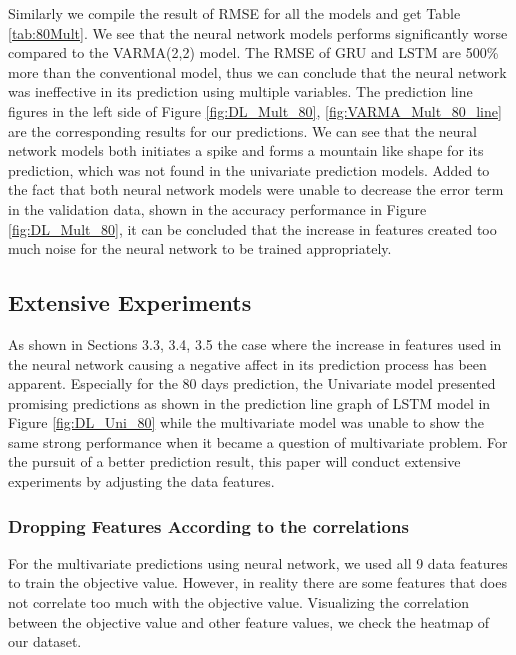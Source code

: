 Similarly we compile the result of RMSE for all the models and get Table \ref{tab:80Mult}. We see that the neural network models performs significantly worse compared to the VARMA(2,2) model. The RMSE of GRU and LSTM are 500\% more than the conventional model, thus we can conclude that the neural network was ineffective in its prediction using multiple variables. The prediction line figures in the left side of Figure \ref{fig:DL_Mult_80}, \ref{fig:VARMA_Mult_80_line} are the corresponding results for our predictions. We can see that the neural network models both initiates a spike and forms a mountain like shape for its prediction, which was not found in the univariate prediction models. Added to the fact that both neural network models were unable to decrease the error term in the validation data, shown in the accuracy performance in Figure \ref{fig:DL_Mult_80}, it can be concluded that the increase in features created too much noise for the neural network to be trained appropriately. 

\clearpage

\subsection{Extensive Experiments}
As shown in Sections 3.3, 3.4, 3.5 the case where the increase in features used in the neural network causing a negative affect in its prediction process has been apparent. Especially for the 80 days prediction, the Univariate model presented promising predictions as shown in the prediction line graph of LSTM model in Figure \ref{fig:DL_Uni_80} while the multivariate model was unable to show the same strong performance when it became a question of multivariate problem. For the pursuit of a better prediction result, this paper will conduct extensive experiments by adjusting the data features.

\subsubsection{Dropping Features According to the correlations}
For the multivariate predictions using neural network, we used all 9 data features to train the objective value. However, in reality there are some features that does not correlate too much with the objective value. Visualizing the correlation between the objective value and other feature values, we check the heatmap of our dataset. 

